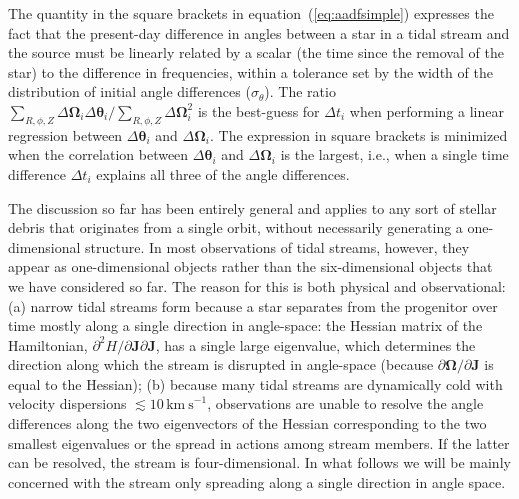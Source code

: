 \documentclass[12pt,preprint]{aastex}
\newcommand{\ie}{i.e.}
\newcommand{\eqnname}{equation}
\renewcommand{\vec}[1]{\ensuremath{\mathbf{#1}}}
\newcommand{\vecj}{\ensuremath{\vec{J}}}
\newcommand{\veco}{\ensuremath{\vec{\Omega}}}
\newcommand{\veca}{\ensuremath{\boldsymbol\theta}}
\newcommand{\kms}{\ensuremath{\,\mathrm{km\ s}^{-1}}}
\begin{document}
The quantity in the square brackets in \eqnname~(\ref{eq:aadfsimple})
expresses the fact that the present-day difference in angles between a
star in a tidal stream and the source must be linearly related by a
scalar (the time since the removal of the star) to the difference in
frequencies, within a tolerance set by the width of the distribution
of initial angle differences ($\sigma_\theta$). The ratio
$\sum_{R,\phi,Z} \Delta \veco_i\Delta \veca_i/\sum_{R,\phi,Z}\Delta
\veco_i^2$ is the best-guess for $\Delta t_i$ when performing a linear
regression between $\Delta \veca_i$ and $\Delta \veco_i$. The
expression in square brackets is minimized when the correlation
between $\Delta \veca_i$ and $\Delta \veco_i$ is the largest, \ie,
when a single time difference $\Delta t_i$ explains all three of the
angle differences.

The discussion so far has been entirely general and applies to any
sort of stellar debris that originates from a single orbit, without
necessarily generating a one-dimensional structure. In most
observations of tidal streams, however, they appear as one-dimensional
objects rather than the six-dimensional objects that we have
considered so far. The reason for this is both physical and
observational: (a) narrow tidal streams form because a star separates
from the progenitor over time mostly along a single direction in
angle-space: the Hessian matrix of the Hamiltonian, $\partial^2 H /
\partial \vecj \partial \vecj$, has a single large eigenvalue, which
determines the direction along which the stream is disrupted in
angle-space (because $\partial \veco / \partial \vecj$ is equal to the
Hessian); (b) because many tidal streams are dynamically cold with
velocity dispersions $\lesssim10\kms$, observations are unable to
resolve the angle differences along the two eigenvectors of the
Hessian corresponding to the two smallest eigenvalues or the spread in
actions among stream members. If the latter can be resolved, the
stream is four-dimensional. In what follows we will be mainly
concerned with the stream only spreading along a single direction in
angle space.
\end{document}

